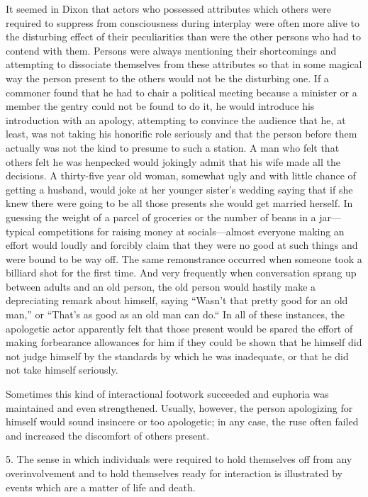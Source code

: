 \documentclass[openany,nobib]{tufte-book}
\begin{document}
It seemed in Dixon that actors who possessed attributes which others
were required to suppress from consciousness during interplay were often
more alive to the disturbing effect of their peculiarities than were the
other persons who had to contend with them. Persons were always
mentioning their shortcomings and attempting to dissociate themselves
from these attributes so that in some magical way the person present to
the others would not be the disturbing one. If a commoner found that he
had to chair a political meeting because a minister or a member the
gentry could not be found to do it, he would introduce his introduction
with an apology, attempting to convince the audience that he, at least,
was not taking his honorific role seriously and that the person before
them actually was not the kind to presume to such a station. A man who
felt that others felt he was henpecked would jokingly admit that his
wife made all the decisions. A thirty-five year old woman, somewhat ugly
and with little chance of getting a husband, would joke at her younger
sister's wedding saying that if she knew there were going to be all
those presents she would get married herself. In guessing the weight of
a parcel of groceries or the number of beans in a jar---typical
competitions for raising money at socials---almost everyone making an
effort would loudly and forcibly claim that they were no good at such
things and were bound to be way off. The same remonstrance occurred when
someone took a billiard shot for the first time. And very frequently
when conversation sprang up between adults and an old person, the old
person would hastily make a depreciating remark about himself, saying
``Wasn't that pretty good for an old man,'' or ``That's as good as an
old man can do.`` In all of these instances, the apologetic actor
apparently felt that those present would be spared the effort of making
forbearance allowances for him if they could be shown that he himself
did not judge himself by the standards by which he was inadequate, or
that he did not take himself seriously.

Sometimes this kind of interactional footwork succeeded and euphoria was
maintained and even strengthened. Usually, however, the person
apologizing for himself would sound insincere or too apologetic; in any
case, the ruse often failed and increased the discomfort of others
present.

5. The sense in which individuals were required to hold themselves off
from any overinvolvement and to hold themselves ready for interaction is
illustrated by events which are a matter of life and death.
\end{document}
